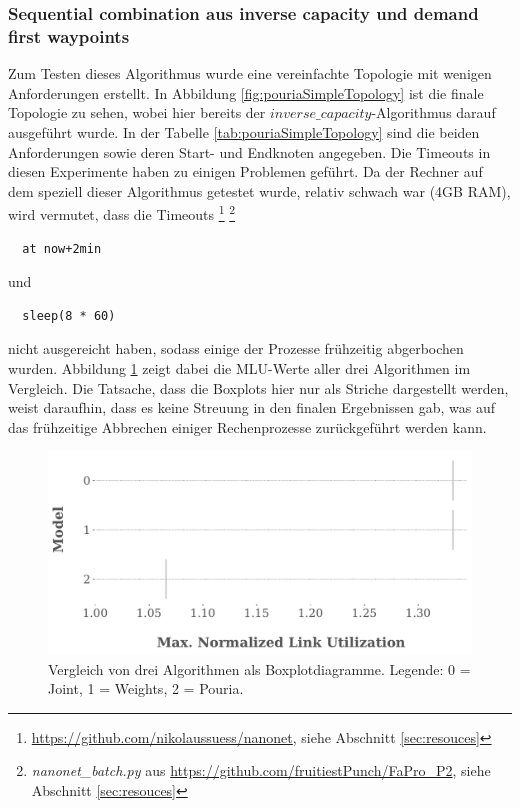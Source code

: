 \documentclass[sigconf, nonacm, review]{acmart}
\begin{document}
\subsubsection{Sequential combination aus inverse capacity und demand first waypoints}
\label{sec:seq_com_p2}
Zum Testen dieses Algorithmus wurde eine vereinfachte Topologie mit wenigen Anforderungen erstellt.
In Abbildung \ref{fig:pouriaSimpleTopology} ist die finale Topologie zu sehen, 
wobei hier bereits der $inverse\_capacity$-Algorithmus darauf ausgef\"uhrt wurde.
In der Tabelle \ref{tab:pouriaSimpleTopology} sind die beiden Anforderungen sowie deren Start- und Endknoten angegeben.
Die Timeouts in diesen Experimente haben zu einigen Problemen gef\"uhrt.
Da der Rechner auf dem speziell dieser Algorithmus getestet wurde,
relativ schwach war (4GB RAM), wird vermutet, 
dass die Timeouts
\footnote{\url{https://github.com/nikolaussuess/nanonet}, siehe Abschnitt \ref{sec:resouces}}
\footnote{\emph{nanonet\_batch.py} aus \url{https://github.com/fruitiestPunch/FaPro_P2}, siehe Abschnitt \ref{sec:resouces}}
\begin{verbatim}
  at now+2min
\end{verbatim}
und 
\begin{verbatim}
  sleep(8 * 60)
\end{verbatim}
nicht ausgereicht haben, sodass einige der Prozesse fr\"uhzeitig abgerbochen wurden.
Abbildung \ref{fig:pouria_boxplot_no_boxes} zeigt dabei die MLU-Werte aller drei Algorithmen im Vergleich.
Die Tatsache, dass die Boxplots hier nur als Striche dargestellt werden, weist daraufhin, dass es keine Streuung in den finalen Ergebnissen gab,
was auf das fr\"uhzeitige Abbrechen einiger Rechenprozesse zur\"uckgef\"uhrt werden kann.
\begin{figure}
\centering
\includegraphics[width=\linewidth]{figures/pouria_boxplot_no_boxes.pdf}
\caption{Vergleich von drei Algorithmen als Boxplotdiagramme. Legende: 0 = Joint, 1 = Weights, 2 = Pouria.}
\label{fig:pouria_boxplot_no_boxes}
\end{figure}
\end{document}

